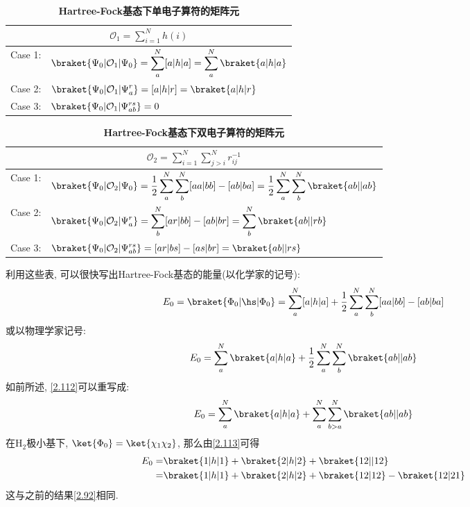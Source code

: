 \begin{table}[ht]
	\renewcommand\arraystretch{1.7}
	\centering
	\caption{\bf Hartree-Fock基态下单电子算符的矩阵元}
	\label{t2.5}
	\begin{tabularx}{\textwidth}{lY}
		\hline
		\\\hline
		Case 1: & $\displaystyle\braket{\Psi_0|\mathcal{O}_1|\Psi_0} = \sum_a^N [a|h|a]=\sum_a^N\braket{a|h|a}$\\
		Case 2: & $\displaystyle\braket{\Psi_0|\mathcal{O}_1|\Psi_a^r} = [a|h|r]=\braket{a|h|r}$\\
		Case 3: & $\displaystyle\braket{\Psi_0|\mathcal{O}_1|\Psi_{ab}^{rs}} = 0$\\\hline
	\end{tabularx}
\end{table}

\begin{table}[ht]
	\renewcommand\arraystretch{1.7}
	\centering
	\caption{\bf Hartree-Fock基态下双电子算符的矩阵元}
	\label{t2.6}
	\begin{tabularx}{\textwidth}{lY}
		\hline
		\\\hline
		Case 1: & $\displaystyle\braket{\Psi_0|\mathcal{O}_2|\Psi_0} = \frac{1}{2}\sum_a^N\sum_b^N [aa|bb]-[ab|ba]=\frac{1}{2}\sum_a^N\sum_b^N\braket{ab||ab}$\\
		Case 2: & $\displaystyle\braket{\Psi_0|\mathcal{O}_2|\Psi_a^r} = \sum_b^N[ar|bb]-[ab|br]=\sum_b^N\braket{ab||rb}$\\
		Case 3: & $\displaystyle\braket{\Psi_0|\mathcal{O}_2|\Psi_{ab}^{rs}} = [ar|bs]-[as|br]=\braket{ab||rs}$\\\hline
	\end{tabularx}
\end{table}

利用这些表, 
可以很快写出Hartree-Fock基态的能量(以化学家的记号):
\begin{equation}\label{eq:2.111}
E_0 = \braket{\Phi_0|\hs|\Phi_0} = \sum_{a}^{N}[a|h|a] + \frac{1}{2}\sum_{a}^{N}\sum_{b}^{N}[aa|bb]-[ab|ba]
\end{equation}  
或以物理学家记号:
\begin{equation}
\label{2.112}
E_0 = \sum_{a}^{N}\braket{a|h|a} + \frac{1}{2}\sum_{a}^{N}\sum_{b}^{N}\braket{ab||ab}
\end{equation}
如前所述, 
\autoref{2.112}可以重写成:
\begin{equation}
\label{2.113}
E_0 = \sum_{a}^{N}\braket{a|h|a} + \sum_{a}^{N}\sum_{b>a}^{N}\braket{ab||ab}
\end{equation}
在$\mathrm{H}_2$极小基下, 
$\ket{\Phi_0}=\ket{\chi_1\chi_2}$, 
那么由\autoref{2.113}可得
\begin{align}
E_0 =& \braket{1|h|1} + \braket{2|h|2} + \braket{12||12}\notag\\
    =& \braket{1|h|1} + \braket{2|h|2} + \braket{12|12} - \braket{12|21}
\end{align}
这与之前的结果\autoref{2.92}相同.



